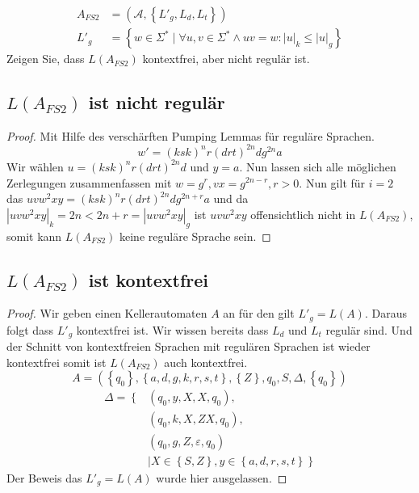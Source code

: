 \documentclass[]{article}
\begin{document}
\begin{align*}
A_{FS2}&=(\mathcal{A},\left\lbrace L'_g,L_d,L_t\right\rbrace )\\
L'_g&=\left\lbrace w\in\Sigma^*\mid\forall u,v\in\Sigma^* \wedge uv=w:|u|_k\leq|u|_g\right\rbrace \end{align*}
Zeigen Sie, dass $L(A_{FS2})$ kontextfrei, aber nicht regul\"ar ist.\\
\subsection{$L(A_{FS2})$ ist nicht regul\"ar}
\begin{proof}Mit Hilfe des versch\"arften Pumping Lemmas f\"ur regul\"are Sprachen.
$$w'=(ksk)^nr(drt)^{2n}dg^{2n}a$$
Wir w\"ahlen $u=(ksk)^nr(drt)^{2n}d$ und $y=a$. Nun lassen sich alle m\"oglichen Zerlegungen zusammenfassen mit $w=g^r,vx=g^{2n-r},r>0$. Nun gilt f\"ur $i=2$ das $uvw^2xy=(ksk)^nr(drt)^{2n}dg^{2n+r}a$ und da $|uvw^2xy|_k=2n<2n+r=|uvw^2xy|_g$ ist $uvw^2xy$ offensichtlich nicht in $L(A_{FS2})$, somit kann $L(A_{FS2})$ keine regul\"are Sprache sein.
\end{proof}
\subsection{$L(A_{FS2})$ ist kontextfrei}
\begin{proof}
Wir geben einen Kellerautomaten $A$ an f\"ur den gilt $L'_g=L(A)$. Daraus folgt dass $L'_g$ kontextfrei ist. Wir wissen bereits dass $L_d$ und $L_t$ regul\"ar sind. Und der Schnitt von kontextfreien Sprachen mit regul\"aren Sprachen ist wieder kontextfrei somit ist $L(A_{FS2})$ auch kontextfrei.
$$A=(\left\lbrace q_0\right\rbrace ,\left\lbrace a,d,g,k,r,s,t\right\rbrace,\left\lbrace Z\right\rbrace ,q_0,S,\Delta ,\left\lbrace q_0\right\rbrace)$$
\begin{align*}
\Delta =\left\lbrace\right.
&(q_0,y,X,X,q_0),\\
&(q_0,k,X,ZX,q_0),\\
&(q_0,g,Z,\varepsilon,q_0)\\&\mid X\in\left\lbrace S,Z \right\rbrace,y\in\left\lbrace a,d,r,s,t\right\rbrace  \left. \right\rbrace 
\end{align*}
Der Beweis das $L'_g=L(A)$ wurde hier ausgelassen.
\end{proof}
\end{document}
